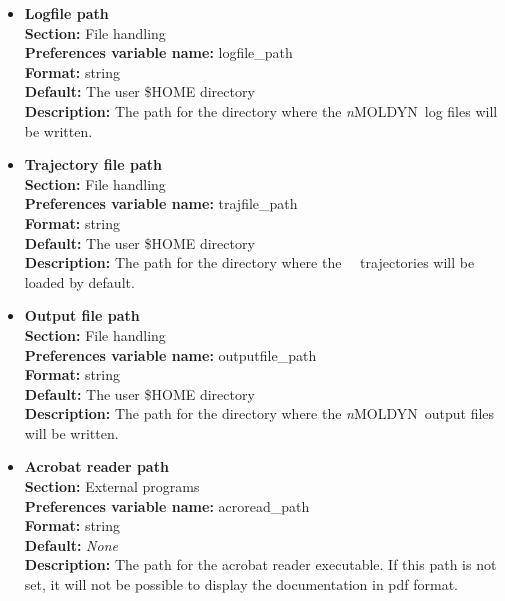 \documentclass[a4paper,11pt]{report}
\newcommand{\NMOLDYN}{\textit{n}MOLDYN}
\begin{document}
\begin{itemize}
\item \textbf{Logfile path}\\
\textbf{Section:} File handling\\
\textbf{Preferences variable name:} logfile\_path\\
\textbf{Format:} string\\
\textbf{Default:} The user \$HOME directory\\
\textbf{Description:} The path for the directory where the \NMOLDYN\ log files will be written.

\hypertarget{preferences_trajfile_path}{}
\item \textbf{Trajectory file path}\\
\textbf{Section:} File handling\\
\textbf{Preferences variable name:} trajfile\_path\\
\textbf{Format:} string\\
\textbf{Default:} The user \$HOME directory\\
\textbf{Description:} The path for the directory where the \MMTK\ \NetCDF\ trajectories will be loaded by default.

\hypertarget{preferences_outputfile_path}{}
\item \textbf{Output file path}\\
\textbf{Section:} File handling\\
\textbf{Preferences variable name:} outputfile\_path\\
\textbf{Format:} string\\
\textbf{Default:} The user \$HOME directory\\
\textbf{Description:} The path for the directory where the \NMOLDYN\ output files will be written.

\hypertarget{preferences_acroread_path}{}
\item \textbf{Acrobat reader path}\\
\textbf{Section:} External programs\\
\textbf{Preferences variable name:} acroread\_path\\
\textbf{Format:} string\\
\textbf{Default:} \textit{None}\\
\textbf{Description:} The path for the acrobat reader executable. If this path is not set, it will not be possible to display the 
documentation in pdf format.


\end{itemize}
\end{document}
